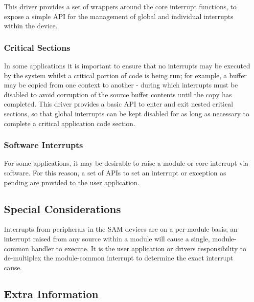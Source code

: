 This driver provides a set of wrappers around the core interrupt functions, to expose a simple A\+PI for the management of global and individual interrupts within the device.\hypertarget{group__asfdoc__sam0__system__interrupt__group_asfdoc_sam0_system_interrupt_module_overview_criticalsec}{}\subsubsection{Critical Sections}\label{group__asfdoc__sam0__system__interrupt__group_asfdoc_sam0_system_interrupt_module_overview_criticalsec}
In some applications it is important to ensure that no interrupts may be executed by the system whilst a critical portion of code is being run; for example, a buffer may be copied from one context to another -\/ during which interrupts must be disabled to avoid corruption of the source buffer contents until the copy has completed. This driver provides a basic A\+PI to enter and exit nested critical sections, so that global interrupts can be kept disabled for as long as necessary to complete a critical application code section.\hypertarget{group__asfdoc__sam0__system__interrupt__group_asfdoc_sam0_system_interrupt_module_overview_softints}{}\subsubsection{Software Interrupts}\label{group__asfdoc__sam0__system__interrupt__group_asfdoc_sam0_system_interrupt_module_overview_softints}
For some applications, it may be desirable to raise a module or core interrupt via software. For this reason, a set of A\+P\+Is to set an interrupt or exception as pending are provided to the user application.\hypertarget{group__asfdoc__sam0__system__interrupt__group_asfdoc_sam0_system_interrupt_special_considerations}{}\subsection{Special Considerations}\label{group__asfdoc__sam0__system__interrupt__group_asfdoc_sam0_system_interrupt_special_considerations}
Interrupts from peripherals in the S\+AM devices are on a per-\/module basis; an interrupt raised from any source within a module will cause a single, module-\/common handler to execute. It is the user application or driver\textquotesingle{}s responsibility to de-\/multiplex the module-\/common interrupt to determine the exact interrupt cause.\hypertarget{group__asfdoc__sam0__system__interrupt__group_asfdoc_sam0_system_interrupt_extra_info}{}\subsection{Extra Information}\label{group__asfdoc__sam0__system__interrupt__group_asfdoc_sam0_system_interrupt_extra_info}
